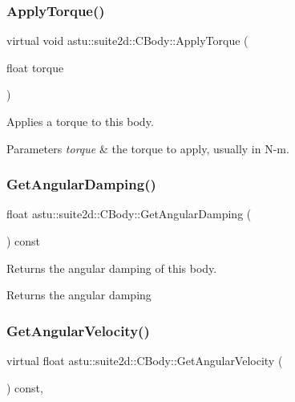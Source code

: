 \subsubsection{\texorpdfstring{Apply\+Torque()}{ApplyTorque()}}
{\footnotesize\ttfamily virtual void astu\+::suite2d\+::\+C\+Body\+::\+Apply\+Torque (\begin{DoxyParamCaption}\item[{float}]{torque }\end{DoxyParamCaption})\hspace{0.3cm}{\ttfamily [pure virtual]}}

Applies a torque to this body.


\begin{DoxyParams}{Parameters}
{\em torque} & the torque to apply, usually in N-\/m. \\
\hline
\end{DoxyParams}
\mbox{\label{classastu_1_1suite2d_1_1CBody_a29017bd14847bdc5f8075de0a519938e}} 
\subsubsection{\texorpdfstring{Get\+Angular\+Damping()}{GetAngularDamping()}}
{\footnotesize\ttfamily float astu\+::suite2d\+::\+C\+Body\+::\+Get\+Angular\+Damping (\begin{DoxyParamCaption}{ }\end{DoxyParamCaption}) const\hspace{0.3cm}{\ttfamily [inline]}}

Returns the angular damping of this body.

\begin{DoxyReturn}{Returns}
the angular damping 
\end{DoxyReturn}
\mbox{\label{classastu_1_1suite2d_1_1CBody_a8b29b3752942062468e9f91f6b72430d}} 
\subsubsection{\texorpdfstring{Get\+Angular\+Velocity()}{GetAngularVelocity()}}
{\footnotesize\ttfamily virtual float astu\+::suite2d\+::\+C\+Body\+::\+Get\+Angular\+Velocity (\begin{DoxyParamCaption}{ }\end{DoxyParamCaption}) const\hspace{0.3cm}{\ttfamily [inline]}, {\ttfamily [virtual]}}

